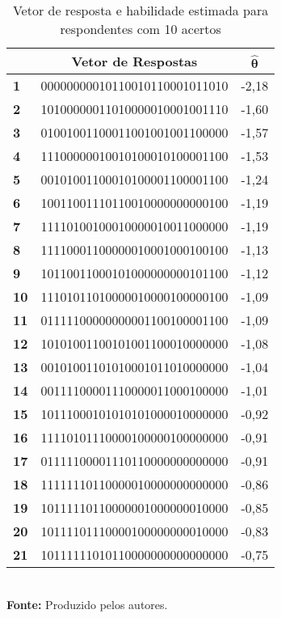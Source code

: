 \begin{table}[!hbt]
	\centering
		\caption{Vetor de resposta e habilidade estimada para respondentes com 10 acertos}
		\label{exemplo-10acertos}
		\begin{tabular*}{0.7\textwidth}{@{\extracolsep{\fill}}lcc@{}}
			\hline
			 & \textbf{Vetor de Respostas} & $\boldsymbol{\hat{\theta}}$  \\ 
		\hline \textbf{1 } & 00000000010110010110001011010 & -2,18   \\ 
		\hline \textbf{2 } & 10100000011010000010001001110 & -1,60   \\ 
		\hline \textbf{3 } & 01001001100011001001001100000 & -1,57   \\ 
		\hline \textbf{4 } & 11100000010010100010100001100 & -1,53   \\ 
		\hline \textbf{5 } & 00101001100010100001100001100 & -1,24   \\ 
		\hline \textbf{6 } & 10011001110110010000000000100 & -1,19   \\ 
		\hline \textbf{7 } & 11110100100010000010011000000 & -1,19   \\ 
		\hline \textbf{8 } & 11110001100000010001000100100 & -1,13   \\ 
		\hline \textbf{9 } & 10110011000101000000000101100 & -1,12   \\ 
		\hline \textbf{10} & 11101011010000010000100000100 & -1,09  \\ 
		\hline \textbf{11} & 01111100000000001100100001100 & -1,09  \\ 
		\hline \textbf{12} & 10101001100101001100010000000 & -1,08  \\ 
		\hline \textbf{13} & 00101001101010001011010000000 & -1,04  \\ 
		\hline \textbf{14} & 00111100001110000011000100000 & -1,01  \\ 
		\hline \textbf{15} & 10111000101010101000010000000 & -0,92  \\ 
		\hline \textbf{16} & 11110101110000100000100000000 & -0,91  \\ 
		\hline \textbf{17} & 01111100001110110000000000000 & -0,91  \\ 
		\hline \textbf{18} & 11111110110000010000000000000 & -0,86  \\ 
		\hline \textbf{19} & 10111110110000001000000010000 & -0,85  \\ 
		\hline \textbf{20} & 10111101110000100000000010000 & -0,83  \\ 
		\hline \textbf{21} & 10111111010110000000000000000 & -0,75  \\
		\hline
		\end{tabular*}\\
		\vspace*{0.5cm}
		\small{\textbf{Fonte:} Produzido pelos autores.}
\end{table}


